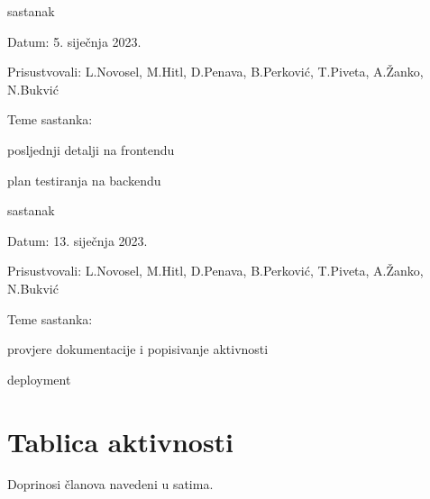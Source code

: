 \begin{packed_enum}
             \item  sastanak
                    \item[] \begin{packed_item}
    				\item Datum: 5. siječnja 2023.
    				\item Prisustvovali: L.Novosel, M.Hitl, D.Penava, B.Perković, T.Piveta, A.Žanko, N.Bukvić
    				\item Teme sastanka:
    				\begin{packed_item}
    				    \item  posljednji detalji na frontendu
                        \item  plan testiranja na backendu
    				\end{packed_item}
            			\end{packed_item}

             \item  sastanak
                    \item[] \begin{packed_item}
    				\item Datum: 13. siječnja 2023.
    				\item Prisustvovali: L.Novosel, M.Hitl, D.Penava, B.Perković, T.Piveta, A.Žanko, N.Bukvić
    				\item Teme sastanka:
    				\begin{packed_item}
    				    \item  provjere dokumentacije i popisivanje aktivnosti
                        \item  deployment
    				\end{packed_item}
            			\end{packed_item}

        
			
		\end{packed_enum}
		
		\eject
		\section*{Tablica aktivnosti}
		
		Doprinosi članova navedeni u satima.\newline
		
